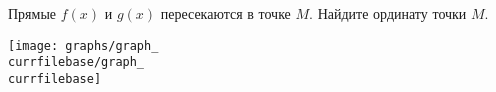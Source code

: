 \begin{ex}
	\begin{condition}
		\begin{minipage}[t]{0.67\textwidth}
			Прямые \( f(x) \) и \( g(x) \) пересекаются в точке \( M \). Найдите ординату точки \( M \).
		\end{minipage}
		\begin{minipage}[c]{0.25\textwidth}
			\texttt{[image: graphs/graph\_\\currfilebase/graph\_\\currfilebase]}
		\end{minipage}
	\end{condition}
\end{ex}